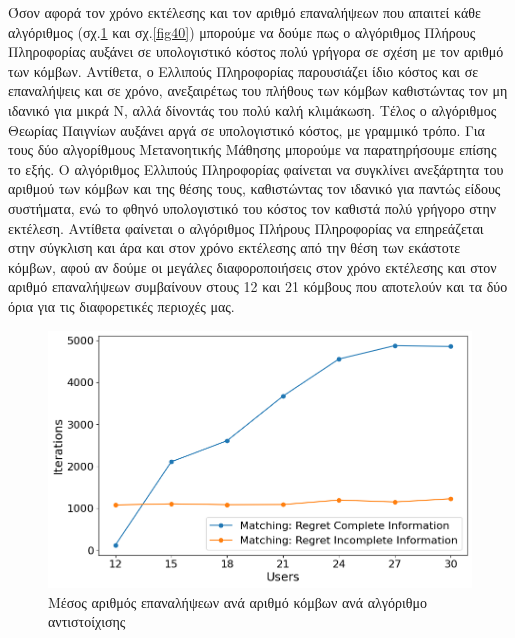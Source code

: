 Όσον αφορά τον χρόνο εκτέλεσης και τον αριθμό επαναλήψεων που απαιτεί κάθε αλγόριθμος (σχ.\ref{fig39} και σχ.\ref{fig40}) μπορούμε να δούμε πως ο αλγόριθμος Πλήρους Πληροφορίας αυξάνει σε υπολογιστικό κόστος πολύ γρήγορα σε σχέση με τον αριθμό των κόμβων. Αντίθετα, ο Ελλιπούς Πληροφορίας παρουσιάζει ίδιο κόστος και σε επαναλήψεις και σε χρόνο, ανεξαιρέτως του πλήθους των κόμβων καθιστώντας τον μη ιδανικό για μικρά Ν, αλλά δίνοντάς του πολύ καλή κλιμάκωση.  Τέλος ο αλγόριθμος Θεωρίας Παιγνίων αυξάνει αργά σε υπολογιστικό κόστος, με γραμμικό τρόπο. Για τους δύο αλγορίθμους Μετανοητικής Μάθησης μπορούμε να παρατηρήσουμε επίσης το εξής. Ο αλγόριθμος Ελλιπούς Πληροφορίας φαίνεται να συγκλίνει ανεξάρτητα του αριθμού των κόμβων και της θέσης τους, καθιστώντας τον ιδανικό για παντώς είδους συστήματα, ενώ το φθηνό υπολογιστικό του κόστος τον καθιστά πολύ γρήγορο στην εκτέλεση. Αντίθετα φαίνεται ο αλγόριθμος Πλήρους Πληροφορίας να επηρεάζεται στην σύγκλιση και άρα και στον χρόνο εκτέλεσης από την θέση των εκάστοτε κόμβων, αφού αν δούμε οι μεγάλες διαφοροποιήσεις στον χρόνο εκτέλεσης και στον αριθμό επαναλήψεων συμβαίνουν στους 12 και 21 κόμβους που αποτελούν και τα δύο όρια για τις διαφορετικές περιοχές μας.

\begin{figure}[H]
    \centering
    \includegraphics[width=\textwidth]{figures/chapter4/Iterations_vs_Users.png}
    \caption{Μέσος αριθμός επαναλήψεων ανά αριθμό κόμβων ανά αλγόριθμο αντιστοίχισης}
    \label{fig39}
\end{figure}

\newpage

